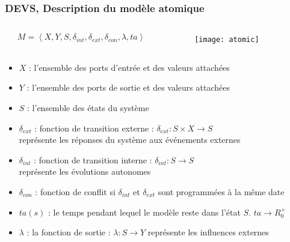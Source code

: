\documentclass[xetex, compress, table, dvipsnames]{beamer}
\begin{document}
\begin{frame}
  \frametitle{DEVS, Description du modèle atomique}
  \begin{exampleblock}{}
    \begin{columns}
      \begin{column}[c]{.45\textwidth}
        \begin{equation*}
          M = \left\langle X,Y, S, \delta_{\mathit{int}}, \delta_{\mathit{ext}},
            \delta_{\mathit{con}},\lambda, \mathit{ta} \right\rangle
        \end{equation*}
      \end{column}
      \begin{column}[c]{.45\textwidth}
        \begin{figure}[h]
          \begin{center}
            \texttt{[image: atomic]}
          \end{center}
        \end{figure}
      \end{column}
    \end{columns}
  \end{exampleblock}
  \begin{exampleblock}{}
    \begin{itemize}[<+->]
    \item $X$ : l'ensemble des \alert{ports d'entrée} et des valeurs
      attachées
    \item $Y$ : l'ensemble des \alert{ports de sortie} et des valeurs
      attachées
    \item $S$ : l'ensemble des \alert{états} du système
    \item $\delta_{ext}$ : fonction de \alert{transition externe} :
      $\delta_{ext} : S \times X \rightarrow S$\\représente les
      réponses du système aux événements externes
    \item $\delta_{int}$ : fonction de \alert{transition interne} :
      $\delta_{int} : S \rightarrow S$\\représente les évolutions
      autonomes
    \item $\delta_{con}$ : fonction de \alert{conflit} si
      $\delta_{int}$ et $\delta_{ext}$ sont programmées à la même date
    \item $ta(s)$ : \alert{le temps} pendant lequel le modèle reste
      dans l'état $S$. $ta \rightarrow R_0^+$
    \item $\lambda$ : la \alert{fonction de sortie} : $\lambda : S
      \rightarrow Y$ représente les influences externes
    \end{itemize}
  \end{exampleblock}
\end{frame}
\end{document}
